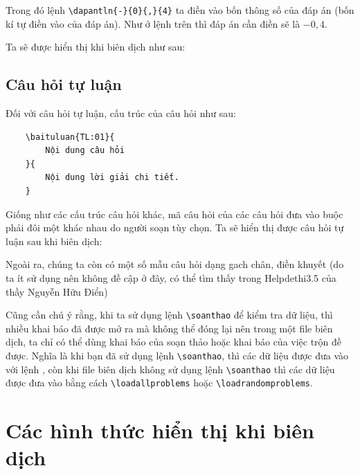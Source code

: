 Trong đó lệnh \verb'\dapantln{-}{0}{,}{4}' ta điền vào bốn thông số của đáp án (bốn kí tự điền vào của đáp án). Như ở lệnh trên thì đáp án cần điền sẽ là $-0,4$.

Ta sẽ được hiển thị khi biên dịch như sau:

\indebailoigiai
\setcounter{socauhoi}{0}
\begin{enumerate}[]
	\foreachproblem[traloingan]{\item\causo\thisproblem}
\end{enumerate}
\section{Câu hỏi tự luận}
Đối với câu hỏi tự luận, cấu trúc của câu hỏi như sau:

\begin{verbatim}
	\baituluan{TL:01}{
		Nội dung câu hỏi
	}{
		Nội dung lời giải chi tiết.
	}
\end{verbatim}

Giống như các cấu trúc câu hỏi khác, mã câu hỏi của các câu hỏi đưa vào buộc phải đôi một khác nhau do người soạn tùy chọn. Ta sẽ hiển thị được câu hỏi tự luận sau khi biên dịch:

\indebailoigiai
\setcounter{socauhoi}{0}
\begin{enumerate}[]
	\foreachproblem[tuluan]{\item\causo\thisproblem}
\end{enumerate}

Ngoài ra, chúng ta còn có một số mẫu câu hỏi dạng gach chân, điền khuyết (do ta ít sử dụng nên không đề cập ở đây, có thể tìm thấy trong Helpdethi3.5 của thầy Nguyễn Hữu Điển)

Cũng cần chú ý rằng, khi ta sử dụng lệnh \verb'\soanthao' để kiểm tra dữ liệu, thì nhiều khai báo đã được mở ra mà không thể đóng lại nên trong một file biên dịch, ta chỉ có thể dùng khai báo của soạn thảo hoặc khai báo của việc trộn đề được. Nghĩa là khi bạn đã sử dụng lệnh \verb'\soanthao', thì các dữ liệu được đưa vào với lệnh \verb'', còn khi file biên dịch không sử dụng lệnh \verb'\soanthao' thì các dữ liệu được đưa vào bằng cách \verb'\loadallproblems' hoặc \verb'\loadrandomproblems'.

\chapter{Các hình thức hiển thị khi biên dịch}
